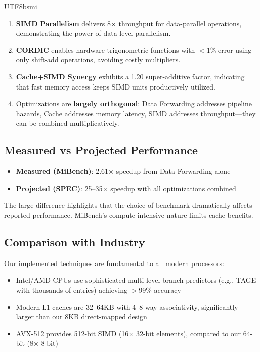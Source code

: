 \documentclass[journal,twoside]{IEEEtran}
\begin{document}
\begin{CJK}{UTF8}{bsmi}
\begin{enumerate}
\item \textbf{SIMD Parallelism} delivers 8$\times$ throughput for data-parallel operations, demonstrating the power of data-level parallelism.

\item \textbf{CORDIC} enables hardware trigonometric functions with $<$1\% error using only shift-add operations, avoiding costly multipliers.

\item \textbf{Cache+SIMD Synergy} exhibits a 1.20 super-additive factor, indicating that fast memory access keeps SIMD units productively utilized.

\item Optimizations are \textbf{largely orthogonal}: Data Forwarding addresses pipeline hazards, Cache addresses memory latency, SIMD addresses throughput---they can be combined multiplicatively.
\end{enumerate}

\subsection{Measured vs Projected Performance}
\begin{itemize}
    \item \textbf{Measured (MiBench)}: 2.61$\times$ speedup from Data Forwarding alone
    \item \textbf{Projected (SPEC)}: 25--35$\times$ speedup with all optimizations combined
\end{itemize}

The large difference highlights that the choice of benchmark dramatically affects reported performance. MiBench's compute-intensive nature limits cache benefits.

\subsection{Comparison with Industry}
Our implemented techniques are fundamental to all modern processors:
\begin{itemize}
    \item Intel/AMD CPUs use sophisticated multi-level branch predictors (e.g., TAGE with thousands of entries) achieving $>$99\% accuracy
    \item Modern L1 caches are 32--64KB with 4--8 way associativity, significantly larger than our 8KB direct-mapped design
    \item AVX-512 provides 512-bit SIMD (16$\times$ 32-bit elements), compared to our 64-bit (8$\times$ 8-bit)
\end{itemize}


\end{CJK}
\end{document}
